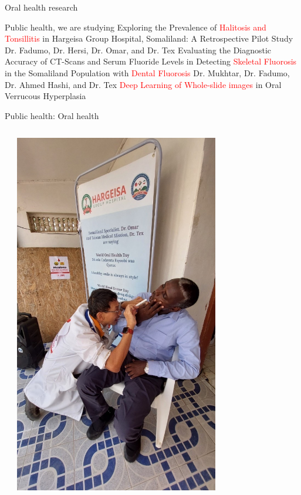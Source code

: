 \documentclass[aspectratio=169]{beamer}
\begin{document}

\begin{frame}{Oral health research}
\begin{outline}

Public health, we are studying
    \1 Exploring the Prevalence of \textcolor{red}{Halitosis and Tonsillitis} in Hargeisa Group Hospital, Somaliland: A Retrospective Pilot Study
        \2 Dr. Fadumo, Dr. Hersi, Dr. Omar, and Dr. Tex
    \1 Evaluating the Diagnostic Accuracy of CT-Scans and Serum Fluoride Levels in Detecting \textcolor{red}{Skeletal Fluorosis} in the Somaliland Population with \textcolor{red}{Dental Fluorosis}
        \2 Dr. Mukhtar, Dr. Fadumo, Dr. Ahmed Hashi, and Dr. Tex
    \1 \textcolor{red}{Deep Learning of Whole-slide images} in Oral Verrucous Hyperplasia
\end{outline}
    
\end{frame}


\begin{frame}{Public health: Oral health}
    \begin{columns}
        
        \begin{center}
        
            
        \end{center}
        \includegraphics[width=0.7\textwidth]{IMG-4368.JPG}
    \end{columns}
\end{frame}
\end{document}
